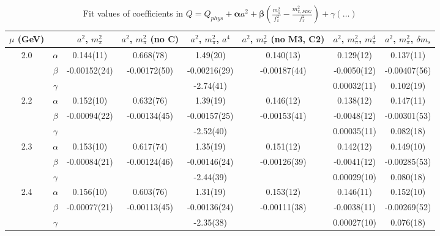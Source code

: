 \documentclass[12pt]{extarticle}
\begin{document}
\begin{table}[h!]
\begin{center}
\begin{tabular}{|c c|c|c|c|c|c|c|}
\hline
$\mu$ (GeV) &  & $a^2$, $m_\pi^2$& $a^2$, $m_\pi^2$ (no C)& $a^2$, $m_\pi^2$, $a^4$& $a^2$, $m_\pi^2$ (no M3, C2)& $a^2$, $m_\pi^2$, $m_\pi^4$& $a^2$, $m_\pi^2$, $\delta m_s$\\
\hline
\multirow{3}{0.5in}{2.0} & $\alpha$ & 0.144(11)& 0.668(78)& 1.49(20)& 0.140(13)& 0.129(12)& 0.137(11)\\
 & $\beta$ & -0.00152(24)& -0.00172(50)& -0.00216(29)& -0.00187(44)& -0.0050(12)& -0.00407(56)\\
 & $\gamma$ &  &  & -2.74(41)&  & 0.00032(11)& 0.102(19)\\
\hline
\multirow{3}{0.5in}{2.2} & $\alpha$ & 0.152(10)& 0.632(76)& 1.39(19)& 0.146(12)& 0.138(12)& 0.147(11)\\
 & $\beta$ & -0.00094(22)& -0.00134(45)& -0.00157(25)& -0.00153(41)& -0.0048(12)& -0.00301(53)\\
 & $\gamma$ &  &  & -2.52(40)&  & 0.00035(11)& 0.082(18)\\
\hline
\multirow{3}{0.5in}{2.3} & $\alpha$ & 0.153(10)& 0.617(74)& 1.35(19)& 0.151(12)& 0.142(12)& 0.149(10)\\
 & $\beta$ & -0.00084(21)& -0.00124(46)& -0.00146(24)& -0.00126(39)& -0.0041(12)& -0.00285(53)\\
 & $\gamma$ &  &  & -2.44(39)&  & 0.00029(10)& 0.080(18)\\
\hline
\multirow{3}{0.5in}{2.4} & $\alpha$ & 0.156(10)& 0.603(76)& 1.31(19)& 0.153(12)& 0.146(11)& 0.152(10)\\
 & $\beta$ & -0.00077(21)& -0.00113(45)& -0.00136(24)& -0.00111(38)& -0.0038(11)& -0.00269(52)\\
 & $\gamma$ &  &  & -2.35(38)&  & 0.00027(10)& 0.076(18)\\
\hline
\end{tabular}
\caption{Fit values of coefficients in $Q = Q_{phys} + \mathbf{\alpha} a^2 + \mathbf{\beta}\left(\frac{m_\pi^2}{f_\pi^2}-\frac{m_{\pi,PDG}^2}{f_\pi^2}\right) + \gamma(\ldots)$}
\end{center}
\end{table}






\end{document}
